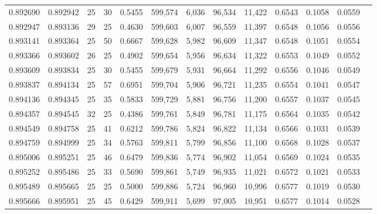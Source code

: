 \begin{tabular}{rrrrrrrrrrrrr}
0.892690 & 0.892942 &    25 &  30 &                                     0.5455 & 599,574 &   6,036 &  96,534 &  11,422 & 0.6543 & 0.1058 & 0.0559 \\
0.892947 & 0.893136 &    29 &  25 &                                     0.4630 & 599,603 &   6,007 &  96,559 &  11,397 & 0.6548 & 0.1056 & 0.0556 \\
0.893141 & 0.893364 &    25 &  50 &                                     0.6667 & 599,628 &   5,982 &  96,609 &  11,347 & 0.6548 & 0.1051 & 0.0554 \\
0.893366 & 0.893602 &    26 &  25 &                                     0.4902 & 599,654 &   5,956 &  96,634 &  11,322 & 0.6553 & 0.1049 & 0.0552 \\
0.893609 & 0.893834 &    25 &  30 &                                     0.5455 & 599,679 &   5,931 &  96,664 &  11,292 & 0.6556 & 0.1046 & 0.0549 \\
0.893837 & 0.894134 &    25 &  57 &                                     0.6951 & 599,704 &   5,906 &  96,721 &  11,235 & 0.6554 & 0.1041 & 0.0547 \\
0.894136 & 0.894345 &    25 &  35 &                                     0.5833 & 599,729 &   5,881 &  96,756 &  11,200 & 0.6557 & 0.1037 & 0.0545 \\
0.894357 & 0.894545 &    32 &  25 &                                     0.4386 & 599,761 &   5,849 &  96,781 &  11,175 & 0.6564 & 0.1035 & 0.0542 \\
0.894549 & 0.894758 &    25 &  41 &                                     0.6212 & 599,786 &   5,824 &  96,822 &  11,134 & 0.6566 & 0.1031 & 0.0539 \\
0.894759 & 0.894999 &    25 &  34 &                                     0.5763 & 599,811 &   5,799 &  96,856 &  11,100 & 0.6568 & 0.1028 & 0.0537 \\
0.895006 & 0.895251 &    25 &  46 &                                     0.6479 & 599,836 &   5,774 &  96,902 &  11,054 & 0.6569 & 0.1024 & 0.0535 \\
0.895252 & 0.895486 &    25 &  33 &                                     0.5690 & 599,861 &   5,749 &  96,935 &  11,021 & 0.6572 & 0.1021 & 0.0533 \\
0.895489 & 0.895665 &    25 &  25 &                                     0.5000 & 599,886 &   5,724 &  96,960 &  10,996 & 0.6577 & 0.1019 & 0.0530 \\
0.895666 & 0.895951 &    25 &  45 &                                     0.6429 & 599,911 &   5,699 &  97,005 &  10,951 & 0.6577 & 0.1014 & 0.0528 \\

\end{tabular}
